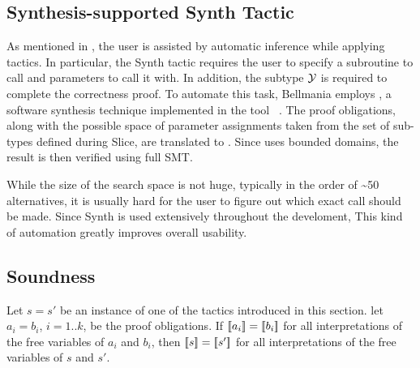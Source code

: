 \subsection{Synthesis-supported {\sf Synth} Tactic}
\label{tactics:synthesis}

As mentioned in , the user is assisted by automatic
inference while applying tactics. In particular, the {\sf Synth} tactic requires
the user to specify a subroutine to call and parameters to call it with.
In addition, the subtype $\mathcal{Y}$ is required to complete the correctness proof.
To automate this task, Bellmania employs {\cegis}, a software synthesis technique
implemented in the tool {\Sketch}~\cite{STTT13/Solar-Lezama}. The proof obligations, along with the possible
space of parameter assignments taken from the set of sub-types defined during
{\sf Slice}, are translated to {\Sketch}. Since {\Sketch} uses bounded domains,
the result is then verified using full SMT.

While the size of the search space is not huge, typically in the order of \textasciitilde50
alternatives, it is usually hard for the user to figure out which exact call
should be made. Since {\sf Synth} is used extensively throughout the develoment,
This kind of automation greatly improves overall usability.

\subsection{Soundness}
\label{tactics:soundness}

\renewenvironment{proof}{\noindent{\bf Proof.~}}{}

\begin{theorem}
Let $s=s'$ be an instance of one of the tactics introduced in this section.
let $a_i=b_i$, $i=1..k$, be the proof obligations. If $[\![{a_i}]\!]=[\![{b_i}]\!]$
for all interpretations of the free variables of $a_i$ and $b_i$, then
$[\![{s}]\!]=[\![{s'}]\!]$ for all interpretations of the free variables of $s$ and $s'$.
\end{theorem}

